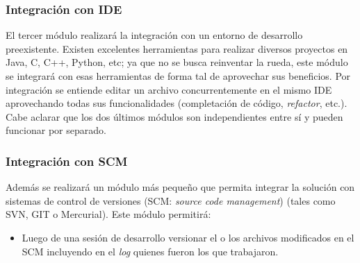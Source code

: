\documentclass[a4paper,11pt]{article}
\begin{document}
				\subsubsection{Integraci\'on con IDE}
					El tercer m\'odulo realizar\'a la integraci\'on con un entorno de desarrollo
					preexistente. Existen excelentes herramientas para realizar diversos
					proyectos en Java, C, C++, Python, etc; ya que no se busca reinventar la rueda,
					este m\'odulo se integrar\'a con esas herramientas de forma tal de aprovechar sus
					beneficios. Por integraci\'on se entiende editar un archivo concurrentemente en
					el mismo IDE aprovechando todas sus funcionalidades (completaci\'on de c\'odigo,
					\textit{refactor}, etc.). \\

			Cabe aclarar que los dos \'ultimos m\'odulos son independientes entre s\'i y pueden
			funcionar por separado.

			\subsubsection{Integraci\'on con SCM}
				Adem\'as se realizar\'a un m\'odulo m\'as peque\~no que permita integrar la soluci\'on
				con sistemas de control de versiones (SCM: \textit{source code management}) (tales como
				SVN, GIT o Mercurial). Este m\'odulo permitir\'a:

				\begin{itemize}
					\item	Luego de una sesi\'on de desarrollo versionar el o los archivos modificados
							en el SCM incluyendo en el \textit{log} quienes fueron los que trabajaron.
				\end{itemize}
\end{document}
